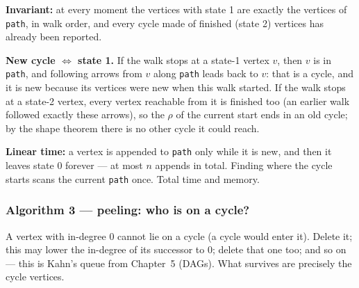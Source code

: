 \begin{invariantbox}
\textbf{Invariant:} at every moment the vertices with state 1 are exactly the vertices of \texttt{path}, in walk order, and every cycle made of finished (state 2) vertices has already been reported.

\textbf{New cycle $\Leftrightarrow$ state 1.} If the walk stops at a state-1 vertex $v$, then $v$ is in \texttt{path}, and following arrows from $v$ along \texttt{path} leads back to $v$: that is a cycle, and it is new because its vertices were new when this walk started. If the walk stops at a state-2 vertex, every vertex reachable from it is finished too (an earlier walk followed exactly these arrows), so the $\rho$ of the current start ends in an old cycle; by the shape theorem there is no other cycle it could reach.

\textbf{Linear time:} a vertex is appended to \texttt{path} only while it is new, and then it leaves state 0 forever --- at most $n$ appends in total. Finding where the cycle starts scans the current \texttt{path} once. Total  time and memory.
\end{invariantbox}

\subsubsection*{Algorithm 3 --- peeling: who is on a cycle?}

A vertex with in-degree $0$ cannot lie on a cycle (a cycle would enter it). Delete it; this may lower the in-degree of its successor to $0$; delete that one too; and so on --- this is Kahn's queue from Chapter~5 (DAGs). What survives are precisely the cycle vertices.

